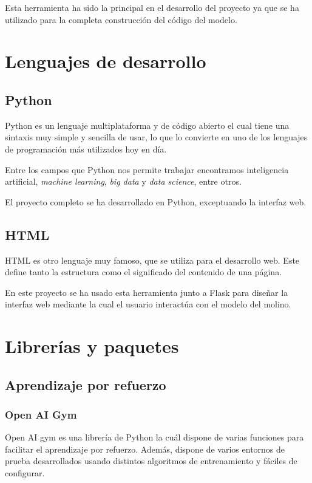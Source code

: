 Esta herramienta ha sido la principal en el desarrollo del proyecto ya que se ha utilizado para la completa construcción del código del modelo.


\section{Lenguajes de desarrollo}

\subsection{Python}

Python\cite{Python} es un lenguaje multiplataforma y de código abierto el cual tiene una sintaxis muy simple y sencilla de usar, lo que lo convierte en uno de los lenguajes de programación más utilizados hoy en día.

Entre los campos que Python nos permite trabajar encontramos inteligencia artificial, \textit{machine learning}, \textit{big data} y \textit{data science}, entre otros.

El proyecto completo se ha desarrollado en Python, exceptuando la interfaz web.

\subsection{HTML}

HTML\cite{HTML} es otro lenguaje muy famoso, que se utiliza para el desarrollo web. Este define tanto la estructura como el significado del contenido de una página.

En este proyecto se ha usado esta herramienta junto a Flask para diseñar la interfaz web mediante la cual el usuario interactúa con el modelo del molino.


\section{Librerías y paquetes}

\subsection{Aprendizaje por refuerzo}

\subsubsection{Open AI Gym}

Open AI gym es una librería de Python la cuál dispone de varias funciones para facilitar el aprendizaje por refuerzo. Además, dispone de varios entornos de prueba desarrollados usando distintos algoritmos de entrenamiento y fáciles de configurar.

